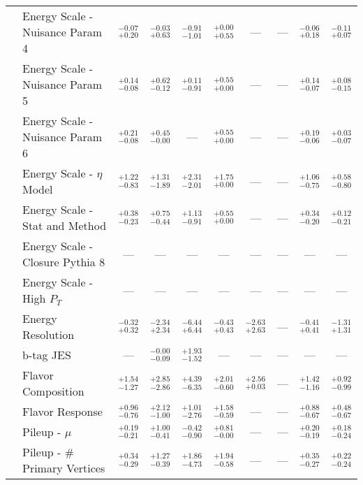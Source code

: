 \begin{tabular}{|cl||cccccc|c||c|}
\cline{2-10}
&Energy Scale - Nuisance Param 4 &  $^{-0.07}_{+0.20}$  &  $^{-0.03}_{+0.63}$  &  $^{-0.91}_{-1.01}$  &  $^{+0.00}_{+0.55}$  & --- & --- &  $^{-0.06}_{+0.18}$  &  $^{-0.11}_{+0.07}$ \\ 
\cline{2-10}
&Energy Scale - Nuisance Param 5 &  $^{+0.14}_{-0.08}$  &  $^{+0.62}_{-0.12}$  &  $^{+0.11}_{-0.91}$  &  $^{+0.55}_{+0.00}$  & --- & --- &  $^{+0.14}_{-0.07}$  &  $^{+0.08}_{-0.15}$ \\ 
\cline{2-10}
&Energy Scale - Nuisance Param 6 &  $^{+0.21}_{-0.08}$  &  $^{+0.45}_{-0.00}$  & --- &  $^{+0.55}_{+0.00}$  & --- & --- &  $^{+0.19}_{-0.06}$  &  $^{+0.03}_{-0.07}$ \\ 
\cline{2-10}
&Energy Scale - $\eta$ Model &  $^{+1.22}_{-0.83}$  &  $^{+1.31}_{-1.89}$  &  $^{+2.31}_{-2.01}$  &  $^{+1.75}_{+0.00}$  & --- & --- &  $^{+1.06}_{-0.75}$  &  $^{+0.58}_{-0.80}$ \\ 
\cline{2-10}
&Energy Scale - Stat and Method &  $^{+0.38}_{-0.23}$  &  $^{+0.75}_{-0.44}$  &  $^{+1.13}_{-0.91}$  &  $^{+0.55}_{+0.00}$  & --- & --- &  $^{+0.34}_{-0.20}$  &  $^{+0.12}_{-0.21}$ \\ 
\cline{2-10}
&Energy Scale - Closure Pythia 8 & --- & --- & --- & --- & --- & --- & --- & ---\\ 
\cline{2-10}
&Energy Scale - High $P_{T}$ & --- & --- & --- & --- & --- & --- & --- & ---\\ 
\cline{2-10}
&Energy Resolution &  $^{-0.32}_{+0.32}$  &  $^{-2.34}_{+2.34}$  &  $^{-6.44}_{+6.44}$  &  $^{-0.43}_{+0.43}$  &  $^{-2.63}_{+2.63}$  & --- &  $^{-0.41}_{+0.41}$  &  $^{-1.31}_{+1.31}$ \\ 
\cline{2-10}
&b-tag JES & --- &  $^{-0.00}_{-0.09}$  &  $^{+1.93}_{-1.52}$  & --- & --- & --- & --- & ---\\ 
\cline{2-10}
&Flavor Composition &  $^{+1.54}_{-1.27}$  &  $^{+2.85}_{-2.86}$  &  $^{+4.39}_{-6.35}$  &  $^{+2.01}_{-0.60}$  &  $^{+2.56}_{+0.03}$  & --- &  $^{+1.42}_{-1.16}$  &  $^{+0.92}_{-0.99}$ \\ 
\cline{2-10}
&Flavor Response &  $^{+0.96}_{-0.76}$  &  $^{+2.12}_{-1.00}$  &  $^{+1.01}_{-2.76}$  &  $^{+1.58}_{-0.59}$  & --- & --- &  $^{+0.88}_{-0.67}$  &  $^{+0.48}_{-0.67}$ \\ 
\cline{2-10}
&Pileup - $\mu$ &  $^{+0.19}_{-0.21}$  &  $^{+1.00}_{-0.41}$  &  $^{-0.42}_{-0.90}$  &  $^{+0.81}_{-0.00}$  & --- & --- &  $^{+0.20}_{-0.19}$  &  $^{+0.18}_{-0.24}$ \\ 
\cline{2-10}
&Pileup - \# Primary Vertices &  $^{+0.34}_{-0.29}$  &  $^{+1.27}_{-0.39}$  &  $^{+1.86}_{-4.73}$  &  $^{+1.94}_{-0.58}$  & --- & --- &  $^{+0.35}_{-0.27}$  &  $^{+0.22}_{-0.24}$ \\ 

\end{tabular}
